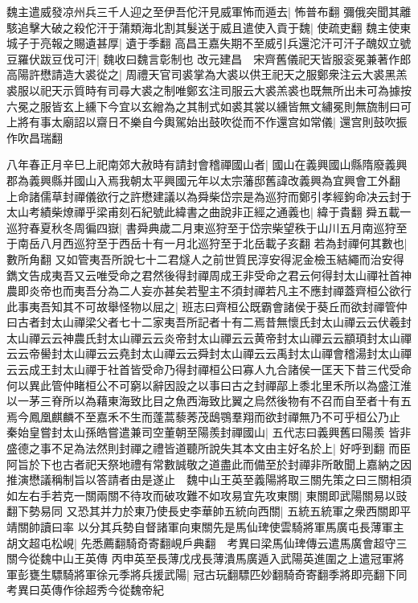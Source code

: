 魏主遣威發凉州兵三千人迎之至伊吾佗汗見威軍怖而遁去|{
	怖普布翻}
彌俄突聞其離駭追擊大破之殺佗汗于蒲類海北割其髮送于威且遣使入貢于魏|{
	使疏吏翻}
魏主使東城子于亮報之賜遺甚厚|{
	遺于季翻}
高昌王嘉失期不至威引兵還沱汗可汗子醜奴立號豆羅伏跋豆伐可汗|{
	魏收曰魏言彰制也}
改元建昌　宋齊舊儀祀天皆服衮冕兼著作郎高陽許懋請造大裘從之|{
	周禮天官司裘掌為大裘以供王祀天之服鄭衆注云大裘黑羔裘服以祀天示質時有司尋大裘之制唯鄭玄注司服云大裘羔裘也既無所出未可為據按六冕之服皆玄上纁下今宜以玄繒為之其制式如裘其裳以纁皆無文繡冕則無旒制曰可}
上將有事太廟詔以齋日不樂自今輿駕始出鼓吹從而不作還宫如常儀|{
	還宫則鼓吹振作吹昌瑞翻}


八年春正月辛巳上祀南郊大赦時有請封會稽禪國山者|{
	國山在義興國山縣隋廢義興郡為義興縣并國山入焉我朝太平興國元年以太宗藩邸舊諱改義興為宜興會工外翻}
上命諸儒草封禪儀欲行之許懋建議以為舜柴岱宗是為巡狩而鄭引孝經鉤命决云封于太山考績柴燎禪乎梁甫刻石紀號此緯書之曲說非正經之通義也|{
	緯于貴翻}
舜五載一巡狩春夏秋冬周徧四嶽|{
	書舜典歲二月東巡狩至于岱宗柴望秩于山川五月南巡狩至于南岳八月西巡狩至于西岳十有一月北巡狩至于北岳載子亥翻}
若為封禪何其數也|{
	數所角翻}
又如管夷吾所說七十二君燧人之前世質民淳安得泥金檢玉結繩而治安得鐫文告成夷吾又云唯受命之君然後得封禪周成王非受命之君云何得封太山禪社首神農即炎帝也而夷吾分為二人妄亦甚矣若聖主不須封禪若凡主不應封禪蓋齊桓公欲行此事夷吾知其不可故舉怪物以屈之|{
	班志曰齊桓公既霸會諸侯于葵丘而欲封禪管仲曰古者封太山禪梁父者七十二家夷吾所記者十有二焉昔無懷氏封太山禪云云伏羲封太山禪云云神農氏封太山禪云云炎帝封太山禪云云黄帝封太山禪云云顓頊封太山禪云云帝嚳封太山禪云云堯封太山禪云云舜封太山禪云云禹封太山禪會稽湯封太山禪云云成王封太山禪于社首皆受命乃得封禪桓公曰寡人九合諸侯一匡天下昔三代受命何以異此管仲睹桓公不可窮以辭因設之以事曰古之封禪鄗上黍北里禾所以為盛江淮以一茅三脊所以為藉東海致比目之魚西海致比翼之烏然後物有不召而自至者十有五焉今鳳凰麒麟不至嘉禾不生而蓬蒿藜莠茂鴟鶚羣翔而欲封禪無乃不可乎桓公乃止}
秦始皇嘗封太山孫皓嘗遣兼司空董朝至陽羨封禪國山|{
	五代志曰義興舊曰陽羨}
皆非盛德之事不足為法然則封禪之禮皆道聽所說失其本文由主好名於上|{
	好呼到翻}
而臣阿旨於下也古者祀天祭地禮有常數誠敬之道盡此而備至於封禪非所敢聞上嘉納之因推演懋議稱制旨以答請者由是遂止　魏中山王英至義陽將取三關先策之曰三關相須如左右手若克一關兩關不待攻而破攻難不如攻易宜先攻東關|{
	東關即武陽關易以豉翻下勢易同}
又恐其并力於東乃使長史李華帥五統向西關|{
	五統五統軍之衆西關即平靖關帥讀曰率}
以分其兵勢自督諸軍向東關先是馬仙琕使雲騎將軍馬廣屯長薄軍主胡文超屯松峴|{
	先悉薦翻騎奇寄翻峴戶典翻　考異曰梁馬仙琕傳云遣馬廣會超守三關今從魏中山王英傳}
丙申英至長薄戊戌長薄潰馬廣遁入武陽英進圍之上遣冠軍將軍彭甕生驃騎將軍徐元季將兵援武陽|{
	冠古玩翻驃匹妙翻騎奇寄翻季將即亮翻下同　考異曰英傳作徐超秀今從魏帝紀}
